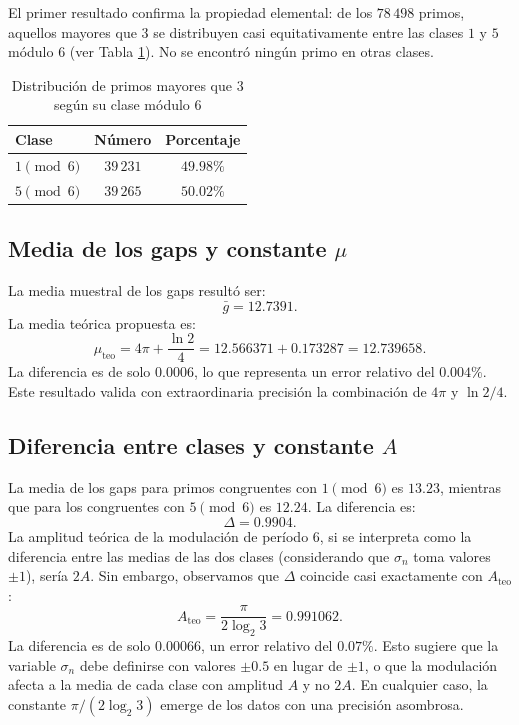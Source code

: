 \documentclass[12pt,a4paper]{article}
\theoremstyle{plain}
\theoremstyle{definition}
\theoremstyle{remark}
\begin{document}
El primer resultado confirma la propiedad elemental: de los $78\,498$ primos, aquellos mayores que $3$ se distribuyen casi equitativamente entre las clases $1$ y $5$ módulo $6$ (ver Tabla \ref{tab:clases}). No se encontró ningún primo en otras clases.

\begin{table}[h]
\centering
\caption{Distribución de primos mayores que $3$ según su clase módulo 6}
\label{tab:clases}
\begin{tabular}{lcc}
\toprule
\textbf{Clase} & \textbf{Número} & \textbf{Porcentaje} \\
\midrule
$1 \pmod{6}$ & $39\,231$ & $49.98\%$ \\
$5 \pmod{6}$ & $39\,265$ & $50.02\%$ \\
\bottomrule
\end{tabular}
\end{table}

\subsection{Media de los gaps y constante $\mu$}

La media muestral de los gaps resultó ser:
\begin{equation}
\bar{g} = 12.7391.
\end{equation}
La media teórica propuesta es:
\begin{equation}
\mu_{\text{teo}} = 4\pi + \frac{\ln 2}{4} = 12.566371 + 0.173287 = 12.739658.
\end{equation}
La diferencia es de solo $0.0006$, lo que representa un error relativo del $0.004\%$. Este resultado valida con extraordinaria precisión la combinación de $4\pi$ y $\ln 2/4$.

\subsection{Diferencia entre clases y constante $A$}

La media de los gaps para primos congruentes con $1 \pmod{6}$ es $13.23$, mientras que para los congruentes con $5 \pmod{6}$ es $12.24$. La diferencia es:
\begin{equation}
\Delta = 0.9904.
\end{equation}
La amplitud teórica de la modulación de período 6, si se interpreta como la diferencia entre las medias de las dos clases (considerando que $\sigma_n$ toma valores $\pm 1$), sería $2A$. Sin embargo, observamos que $\Delta$ coincide casi exactamente con $A_{\text{teo}}$:
\begin{equation}
A_{\text{teo}} = \frac{\pi}{2\log_2 3} = 0.991062.
\end{equation}
La diferencia es de solo $0.00066$, un error relativo del $0.07\%$. Esto sugiere que la variable $\sigma_n$ debe definirse con valores $\pm 0.5$ en lugar de $\pm 1$, o que la modulación afecta a la media de cada clase con amplitud $A$ y no $2A$. En cualquier caso, la constante $\pi/(2\log_2 3)$ emerge de los datos con una precisión asombrosa.
\end{document}
